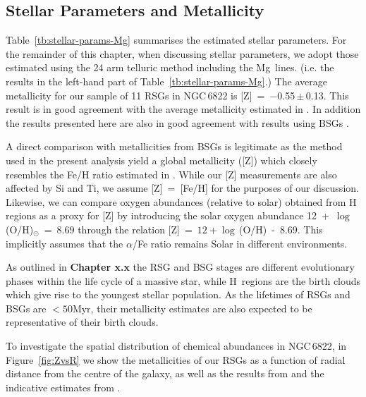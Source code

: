 \begin{table}
\begin{center}
\begin{tabular}{lc cccc c cccc}
  \hline
  \end{tabular}
  \end{center}
\end{table}



\subsection{Stellar Parameters and Metallicity} %
\label{sub:stellar_parameters_and_metallicity}

Table~\ref{tb:stellar-params-Mg} summarises the estimated stellar parameters.
For the remainder of this chapter, when discussing stellar parameters,
we adopt those estimated using the 24 arm telluric method including the Mg\,\1 lines.
(i.e. the results in the left-hand part of Table~\ref{tb:stellar-params-Mg}.)
The average metallicity for our sample of 11 RSGs in NGC\,6822 is
[Z]~=~$-$0.55\,$\pm$\,0.13.
This result is in good agreement with the average metallicity estimated in
\citet[][see also Figure~\ref{fig:ZvsR}]{2015ApJ...803...14P}.
In addition the results presented here are also in good agreement with results using BSGs
\citep[BSGs;][]{1999A&A...352L..40M,2001ApJ...547..765V}.

A direct comparison with metallicities from BSGs is legitimate as the method used in the present analysis yield a global metallicity ([Z]) which
closely resembles the Fe/H ratio estimated in
\cite{2001ApJ...547..765V}.
While our [Z] measurements are also affected by Si and Ti,
we assume [Z]~=~[Fe/H] for the purposes of our discussion.
Likewise, we can compare oxygen abundances (relative to solar) obtained from H\,\2 regions as a proxy for [Z] by
introducing the solar oxygen abundance
{12~+~$\log$\,(O/H)}$_{\odot}$~=~8.69
\citep{2009ARA&A..47..481A} through the relation
[Z]~=~$12 + \log$\,(O/H)~-~8.69.
This implicitly assumes that the $\alpha$/Fe ratio remains Solar in different environments.

As outlined in \textbf{Chapter x.x} the RSG and BSG stages are different evolutionary phases within the life cycle of a massive star,
while H\,\2 regions are the birth clouds which give rise to the youngest stellar population.
As the lifetimes of RSGs and BSGs are $<50$Myr,
their metallicity estimates are also expected to be representative of their birth clouds.

To investigate the spatial distribution of chemical abundances in NGC\,6822,
in Figure~\ref{fig:ZvsR}
we show the metallicities of our RSGs as a function of radial distance from the centre of the galaxy,
as well as the results from
\cite{2001ApJ...547..765V} and the indicative estimates from
\cite{1999A&A...352L..40M}.


